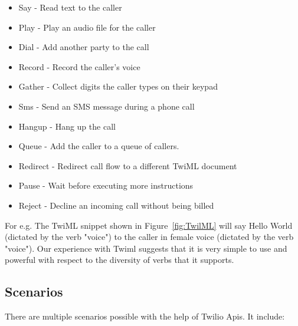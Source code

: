 \begin{itemize}
\item Say - Read text to the caller 
\item Play - Play an audio file for the caller
\item Dial - Add another party to the call
\item Record - Record the caller's voice
\item Gather - Collect digits the caller types on their keypad
\item Sms - Send an SMS message during a phone call
\item Hangup - Hang up the call
\item Queue - Add the caller to a queue of callers.
\item Redirect - Redirect call flow to a different TwiML document
\item Pause - Wait before executing more instructions
\item Reject - Decline an incoming call without being billed
\end{itemize}

For e.g. The TwiML snippet shown in Figure~\ref{fig:TwilML} will say Hello World (dictated by the verb "voice") to the caller in female voice (dictated by the verb "voice"). Our experience with Twiml suggests that it is very simple to use and powerful with respect to the diversity of verbs that it supports.



\subsection{Scenarios}

There are multiple scenarios possible with the help of Twilio Apis. It include:

